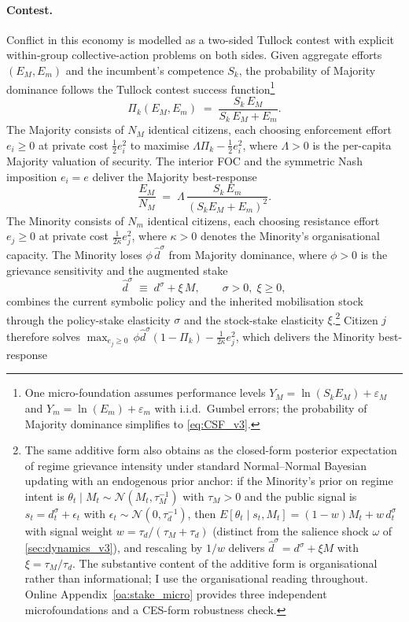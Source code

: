 \documentclass[11pt,twoside]{extarticle}
\begin{document}
\paragraph{Contest.} Conflict in this economy is modelled as a two-sided Tullock contest with explicit within-group collective-action problems on both sides. Given aggregate efforts $(E_M,E_m)$ and the incumbent's competence $S_k$, the probability of Majority dominance follows the Tullock contest success function\footnote{One micro-foundation \citep*{skaperdasContestSuccessFunctions1996,jiaStochasticDerivationRatio2008} assumes performance levels $Y_M=\ln(S_kE_M)+\varepsilon_M$ and $Y_m=\ln(E_m)+\varepsilon_m$ with i.i.d.\ Gumbel errors; the probability of Majority dominance simplifies to \autoref{eq:CSF_v3}.}
\begin{equation}\label{eq:CSF_v3}
    \Pi_k(E_M,E_m)\;=\;\frac{S_k\,E_M}{S_k\,E_M+E_m}.
\end{equation}
The Majority consists of $N_M$ identical citizens, each choosing enforcement effort $e_i\ge 0$ at private cost $\tfrac{1}{2}e_i^2$ to maximise $\Lambda\Pi_k-\tfrac{1}{2}e_i^2$, where $\Lambda>0$ is the per-capita Majority valuation of security. The interior FOC and the symmetric Nash imposition $e_i=e$ deliver the Majority best-response
\begin{equation}\label{eq:EM_BR_v3}
    \frac{E_M}{N_M}\;=\;\Lambda\,\frac{S_k\,E_m}{(S_k E_M+E_m)^2}.
\end{equation}
The Minority consists of $N_m$ identical citizens, each choosing resistance effort $e_j\ge 0$ at private cost $\tfrac{1}{2\kappa}e_j^2$, where $\kappa>0$ denotes the Minority's organisational capacity. The Minority loses $\phi\,\hat d^\sigma$ from Majority dominance, where $\phi>0$ is the grievance sensitivity and the augmented stake
\begin{equation}\label{eq:dhat_v3}
    \hat d^\sigma\;\equiv\;d^\sigma+\xi\,M,\qquad\sigma>0,\;\xi\ge 0,
\end{equation}
combines the current symbolic policy and the inherited mobilisation stock through the policy-stake elasticity $\sigma$ and the stock-stake elasticity $\xi$.\footnote{The same additive form also obtains as the closed-form posterior expectation of regime grievance intensity under standard Normal--Normal Bayesian updating with an endogenous prior anchor: if the Minority's prior on regime intent is $\theta_t\mid M_t\sim\mathcal{N}(M_t,\tau_M^{-1})$ with $\tau_M>0$ and the public signal is $s_t=d_t^\sigma+\epsilon_t$ with $\epsilon_t\sim\mathcal{N}(0,\tau_d^{-1})$, then $E[\theta_t\mid s_t,M_t]=(1-w)M_t+w\,d_t^\sigma$ with signal weight $w=\tau_d/(\tau_M+\tau_d)$ (distinct from the salience shock $\omega$ of \autoref{sec:dynamics_v3}), and rescaling by $1/w$ delivers $\hat d^\sigma=d^\sigma+\xi M$ with $\xi=\tau_M/\tau_d$. The substantive content of the additive form is organisational rather than informational; I use the organisational reading throughout. Online Appendix~\ref{oa:stake_micro} provides three independent microfoundations and a CES-form robustness check.} Citizen $j$ therefore solves $\max_{e_j\ge 0}\,\phi\hat d^\sigma(1-\Pi_k)-\tfrac{1}{2\kappa}e_j^2$, which delivers the Minority best-response
\end{document}
